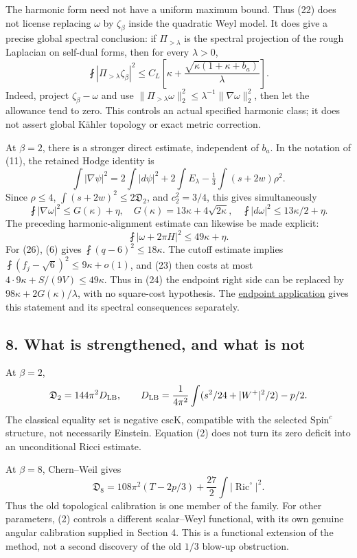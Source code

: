 \documentclass[
  11pt,
]{article}
\begin{document}
The harmonic form need not have a uniform maximum bound. Thus (22) does
not license replacing \(\omega\) by \(\zeta_\beta\) inside the quadratic
Weyl model. It does give a precise global spectral conclusion: if
\(\Pi_{>\lambda}\) is the spectral projection of the rough Laplacian on
self-dual forms, then for every \(\lambda>0\), \[
\fint|\Pi_{>\lambda}\zeta_\beta|^2
\le C_L\left[\kappa+
\frac{\sqrt{\kappa(1+\kappa+b_a)}}{\lambda}\right].
\tag{24}
\] Indeed, project \(\zeta_\beta-\omega\) and use
\(\|\Pi_{>\lambda}\omega\|_2^2 \le\lambda^{-1}\|\nabla\omega\|_2^2\),
then let the allowance tend to zero. This controls an actual specified
harmonic class; it does not assert global Kähler topology or exact
metric correction.

At \(\beta=2\), there is a stronger direct estimate, independent of
\(b_a\). In the notation of (11), the retained Hodge identity is \[
\int|\nabla\psi|^2
=2\int|d\psi|^2+2\int E_\lambda
-\tfrac13\int(s+2w)\rho^2.
\] Since \(\rho\le4\), \(\int(s+2w)^2\le2\mathfrak D_2\), and
\(c_2^2=3/4\), this gives simultaneously \[
\fint|\nabla\omega|^2\le G(\kappa)+\eta,
\quad G(\kappa)=13\kappa+4\sqrt{2\kappa},
\quad
\fint|d\omega|^2\le13\kappa/2+\eta.
\tag{25}
\] The preceding harmonic-alignment estimate can likewise be made
explicit: \[
\fint|\omega+2\pi H|^2\le49\kappa+\eta.
\tag{26}
\] For (26), (6) gives \(\fint(q-6)^2\le18\kappa\). The cutoff estimate
implies \(\fint(f_j-\sqrt6)^2\le9\kappa+o(1)\), and (23) then costs at
most \(4\cdot9\kappa+S/(9V)\le49\kappa\). Thus in (24) the endpoint
right side can be replaced by \(98\kappa+2G(\kappa)/\lambda\), with no
square-cost hypothesis. The
\href{line1_composed_application.md}{endpoint application} gives this
statement and its spectral consequences separately.

\hypertarget{what-is-strengthened-and-what-is-not}{%
\subsection{8. What is strengthened, and what is
not}\label{what-is-strengthened-and-what-is-not}}

At \(\beta=2\), \[
\mathfrak D_2=144\pi^2D_{\rm LB},\qquad
D_{\rm LB}=\frac1{4\pi^2}\int(s^2/24+|W^+|^2/2)-p/2.
\] The classical equality set is negative cscK, compatible with the
selected Spin\(^c\) structure, not necessarily Einstein. Equation (2)
does not turn its zero deficit into an unconditional Ricci estimate.

At \(\beta=8\), Chern--Weil gives \[
\mathfrak D_8
=108\pi^2(T-2p/3)+\frac{27}{2}\int|\operatorname{Ric}^{\circ}|^2.
\tag{27}
\] Thus the old topological calibration is one member of the family. For
other parameters, (2) controls a different scalar--Weyl functional, with
its own genuine angular calibration supplied in Section 4. This is a
functional extension of the method, not a second discovery of the old
\(1/3\) blow-up obstruction.
\end{document}
